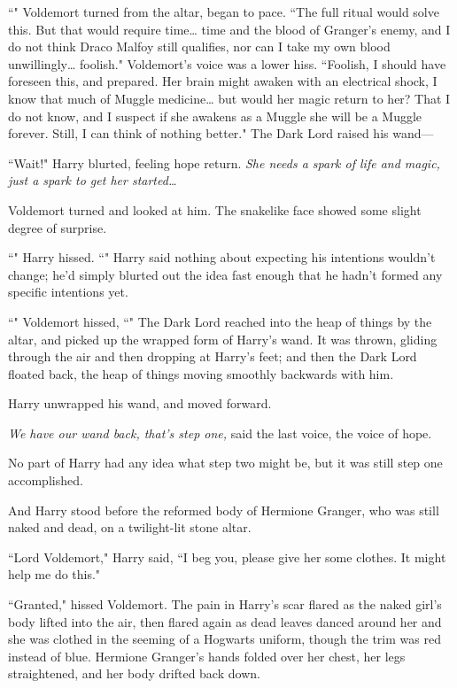 ``" Voldemort turned from the altar, began to pace. ``The full ritual would solve this. But that would require time{\ldots} time and the blood of Granger's enemy, and I do not think Draco Malfoy still qualifies, nor can I take my own blood unwillingly{\ldots} foolish." Voldemort's voice was a lower hiss. ``Foolish, I should have foreseen this, and prepared. Her brain might awaken with an electrical shock, I know that much of Muggle medicine{\ldots} but would her magic return to her? That I do not know, and I suspect if she awakens as a Muggle she will be a Muggle forever. Still, I can think of nothing better." The Dark Lord raised his wand—

``Wait!" Harry blurted, feeling hope return. \emph{She needs a spark of life and magic, just a spark to get her started{\ldots}}

Voldemort turned and looked at him. The snakelike face showed some slight degree of surprise.

``" Harry hissed. ``" Harry said nothing about expecting his intentions wouldn't change; he'd simply blurted out the idea fast enough that he hadn't formed any specific intentions yet.

``" Voldemort hissed, ``" The Dark Lord reached into the heap of things by the altar, and picked up the wrapped form of Harry's wand. It was thrown, gliding through the air and then dropping at Harry's feet; and then the Dark Lord floated back, the heap of things moving smoothly backwards with him.

Harry unwrapped his wand, and moved forward.

\emph{We have our wand back, that's step one,} said the last voice, the voice of hope.

No part of Harry had any idea what step two might be, but it was still step one accomplished.

And Harry stood before the reformed body of Hermione Granger, who was still naked and dead, on a twilight-lit stone altar.

``Lord Voldemort," Harry said, ``I beg you, please give her some clothes. It might help me do this."

``Granted," hissed Voldemort. The pain in Harry's scar flared as the naked girl's body lifted into the air, then flared again as dead leaves danced around her and she was clothed in the seeming of a Hogwarts uniform, though the trim was red instead of blue. Hermione Granger's hands folded over her chest, her legs straightened, and her body drifted back down.

